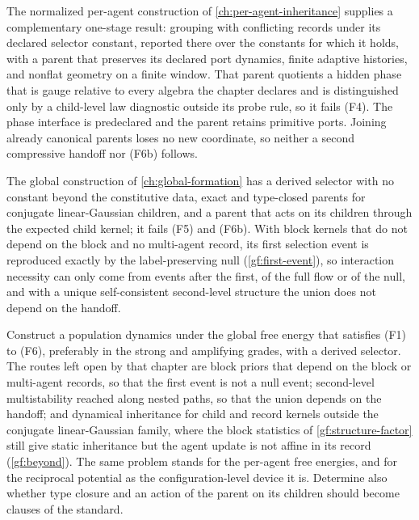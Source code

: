The normalized per-agent construction of \cref{ch:per-agent-inheritance}
supplies a complementary one-stage result: grouping with conflicting
records under its declared selector constant, reported there over the
constants for which it holds, with a parent that preserves its declared port
dynamics, finite adaptive histories, and nonflat geometry on a finite
window. That parent quotients a hidden phase that is gauge relative to every
algebra the chapter declares and is distinguished only by a child-level law
diagnostic outside its probe rule, so it fails (F4). The phase interface is
predeclared and the parent retains primitive ports. Joining already
canonical parents loses no new coordinate, so neither a second compressive
handoff nor (F6b) follows.

The global construction of \cref{ch:global-formation} has a derived selector
with no constant beyond the constitutive data, exact and type-closed parents
for conjugate linear-Gaussian children, and a parent that acts on its
children through the expected child kernel; it fails (F5) and (F6b). With
block kernels that do not depend on the block and no multi-agent record, its
first selection event is reproduced exactly by the label-preserving null
(\cref{gf:first-event}), so interaction necessity can only come from events
after the first, of the full flow or of the null, and with a unique
self-consistent second-level structure the union does not depend on the
handoff.

Construct a population dynamics under the global free energy that
satisfies (F1) to (F6), preferably in the strong and amplifying grades, with
a derived selector. The routes left open by that chapter are block priors
that depend on the block or multi-agent records, so that the first event is
not a null event; second-level multistability reached along nested paths, so
that the union depends on the handoff; and dynamical inheritance for child
and record kernels outside the conjugate linear-Gaussian family, where the
block statistics of \cref{gf:structure-factor} still give static inheritance
but the agent update is not affine in its record (\cref{gf:beyond}). The
same problem stands for the per-agent free energies, and for the reciprocal
potential as the configuration-level device it is. Determine also whether
type closure and an action of the parent on its children should become
clauses of the standard.
